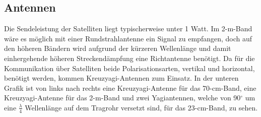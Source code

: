 \subsection{Antennen}
Die Sendeleistung der Satelliten liegt typischerweise unter 1 Watt. Im 2-m-Band wäre es möglich mit einer Rundstrahlantenne ein Signal zu empfangen, 
doch auf den höheren Bändern wird aufgrund der kürzeren Wellenlänge und damit einhergehende höheren Streckendämpfung eine Richtantenne benötigt. 
Da für die Kommunikation über Satelliten beide Polarisationsarten, vertikal und horizontal, benötigt werden, kommen Kreuzyagi-Antennen zum Einsatz.  
In der unteren Grafik ist von links nach rechts eine Kreuzyagi-Antenne für das 70-cm-Band, eine Kreuzyagi-Antenne für das 2-m-Band und zwei 
Yagiantennen, welche von 90$^\circ$ um eine $\frac{\lambda}{4}$ Wellenlänge auf dem Tragrohr versetzt sind, für das 23-cm-Band, zu sehen. 

